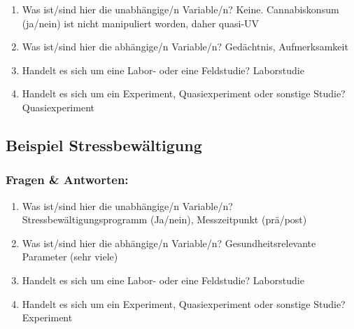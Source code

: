 \documentclass[
]{book}
\providecommand{\tightlist}{%
  \setlength{\itemsep}{0pt}\setlength{\parskip}{0pt}}
\begin{document}
\begin{enumerate}
\def\labelenumi{\arabic{enumi}.}
\tightlist
\item
  Was ist/sind hier die unabhängige/n Variable/n? \smallskip \newline Keine. Cannabiskonsum (ja/nein) ist nicht manipuliert worden, daher quasi-UV \smallskip \newline
\item
  Was ist/sind hier die abhängige/n Variable/n? \smallskip \newline Gedächtnis, Aufmerksamkeit \smallskip \newline
\item
  Handelt es sich um eine Labor- oder eine Feldstudie? \smallskip \newline Laborstudie \smallskip \newline
\item
  Handelt es sich um ein Experiment, Quasiexperiment oder sonstige Studie? \smallskip \newline Quasiexperiment
\end{enumerate}

\hypertarget{beispiel-stressbewuxe4ltigung}{%
\subsection{Beispiel Stressbewältigung}\label{beispiel-stressbewuxe4ltigung}}

\hypertarget{fragen-antworten-2}{%
\subsubsection{Fragen \& Antworten:}\label{fragen-antworten-2}}

\begin{enumerate}
\def\labelenumi{\arabic{enumi}.}
\tightlist
\item
  Was ist/sind hier die unabhängige/n Variable/n? \smallskip \newline Stressbewältigungsprogramm (Ja/nein), Messzeitpunkt (prä/post) \smallskip \newline
\item
  Was ist/sind hier die abhängige/n Variable/n? \smallskip \newline Gesundheitsrelevante Parameter (sehr viele) \smallskip \newline
\item
  Handelt es sich um eine Labor- oder eine Feldstudie? \smallskip \newline Laborstudie \smallskip \newline
\item
  Handelt es sich um ein Experiment, Quasiexperiment oder sonstige Studie? \smallskip \newline Experiment
\end{enumerate}
\end{document}
